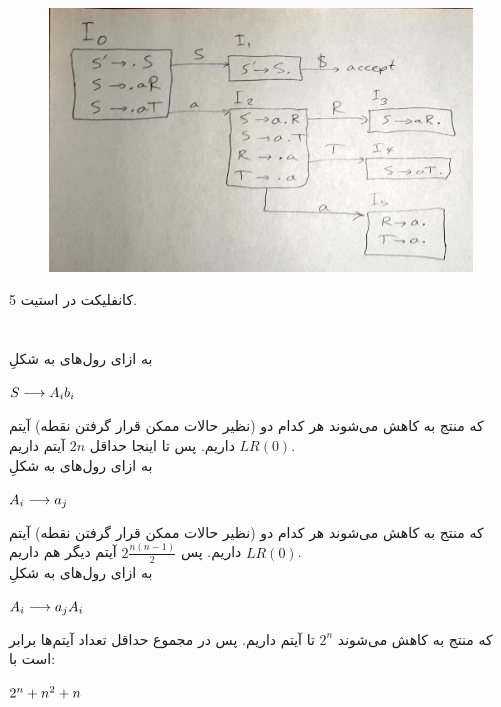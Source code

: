 \documentclass{article}
\begin{document}
\begin{figure}[H]
    \centering
    \includegraphics[width=1.0\textwidth]{figures/7b.jpg}
    \caption
	{}
    \label{fig:fig1}
\end{figure}

کانفلیکت در استیت 5.


\section{}%
به ازای رول‌های به شکلِ
\begin{latin}
$\\
S \longrightarrow A_i b_i
$
\end{latin}
که منتج به کاهش می‌شوند هر کدام دو (نظیر حالات ممکن قرار گرفتن نقطه) آیتم $LR(0)$ داریم. پس تا اینجا حداقل $2n$ آیتم داریم.\\
به ازای رول‌های به شکلِ
\begin{latin}
$\\
A_i \longrightarrow a_j
$
\end{latin}
که منتج به کاهش می‌شوند هر کدام دو (نظیر حالات ممکن قرار گرفتن نقطه) آیتم $LR(0)$ داریم. پس $2\frac{n(n-1)}{2}$ آیتم دیگر هم داریم.\\
به ازای رول‌های به شکلِ
\begin{latin}
$\\
A_i \longrightarrow a_j A_i
$
\end{latin}
که منتج به کاهش می‌شوند $2^n$ تا آیتم داریم. پس در مجموع حداقل تعداد آیتم‌ها برابر است با:
\begin{latin}
$\\
2 ^ n + n ^ 2 + n
$
\end{latin}



\section{}%
\end{document}
